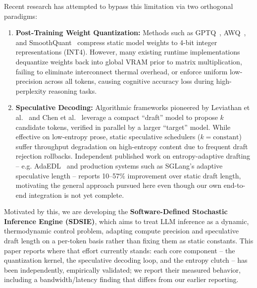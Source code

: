 \documentclass[10pt,journal,compsoc,twocolumn]{IEEEtran}
\begin{document}
Recent research has attempted to bypass this limitation via two orthogonal paradigms:
\begin{enumerate}
    \item \textbf{Post-Training Weight Quantization:} Methods such as GPTQ~\cite{frantar2022gptq}, AWQ~\cite{lin2023awq}, and SmoothQuant~\cite{xiao2023smoothquant} compress static model weights to 4-bit integer representations (INT4). However, many existing runtime implementations dequantize weights back into global VRAM prior to matrix multiplication, failing to eliminate interconnect thermal overhead, or enforce uniform low-precision across all tokens, causing cognitive accuracy loss during high-perplexity reasoning tasks.
    \item \textbf{Speculative Decoding:} Algorithmic frameworks pioneered by Leviathan et al.~\cite{leviathan2023fast} and Chen et al.~\cite{chen2023speculative} leverage a compact ``draft'' model to propose $k$ candidate tokens, verified in parallel by a larger ``target'' model. While effective on low-entropy prose, static speculative schedulers ($k=\text{constant}$) suffer throughput degradation on high-entropy content due to frequent draft rejection rollbacks. Independent published work on entropy-adaptive drafting -- e.g. AdaEDL~\cite{adaedl2024} and production systems such as SGLang's adaptive speculative length -- reports 10--57\% improvement over static draft length, motivating the general approach pursued here even though our own end-to-end integration is not yet complete.
\end{enumerate}

Motivated by this, we are developing the \textbf{Software-Defined Stochastic Inference Engine (SDSIE)}, which aims to treat LLM inference as a dynamic, thermodynamic control problem, adapting compute precision and speculative draft length on a per-token basis rather than fixing them as static constants. This paper reports where that effort currently stands: each core component -- the quantization kernel, the speculative decoding loop, and the entropy clutch -- has been independently, empirically validated; we report their measured behavior, including a bandwidth/latency finding that differs from our earlier reporting.
\end{document}
